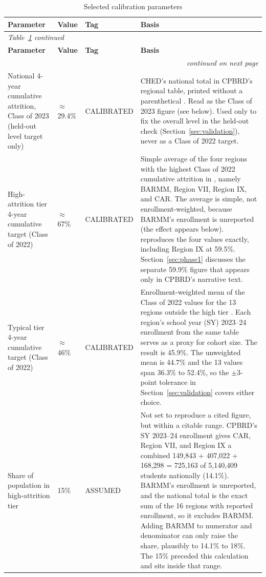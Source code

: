 \documentclass[11pt]{article}
\begin{document}
{\small
\begin{longtable}{@{}p{}p{}p{}p{}@{}}
\caption{Selected calibration parameters}
\label{tab:params}\\
\toprule
\textbf{Parameter} & \textbf{Value} & \textbf{Tag} & \textbf{Basis} \\
\midrule
\endfirsthead
\multicolumn{4}{l}{\textit{Table~\ref{tab:params} continued}}\\
\toprule
\textbf{Parameter} & \textbf{Value} & \textbf{Tag} & \textbf{Basis} \\
\midrule
\endhead
\midrule
\multicolumn{4}{r}{\textit{continued on next page}}\\
\endfoot
\bottomrule
\endlastfoot
National 4-year cumulative attrition, Class of 2023 (held-out level target only) & $\approx$ 29.4\% & CALIBRATED & CHED's national total in CPBRD's regional table, printed without a parenthetical \citep{cpbrd2026}. Read as the Class of 2023 figure (see below). Used only to fix the overall level in the held-out check (Section~\ref{sec:validation}), never as a Class of 2022 target. \\
\addlinespace
High-attrition tier 4-year cumulative target (Class of 2022) & $\approx$ 67\% & CALIBRATED & Simple average of the four regions with the highest Class of 2022 cumulative attrition in \citep{cpbrd2026}, namely BARMM, Region VII, Region IX, and CAR. The average is simple, not enrollment-weighted, because BARMM's enrollment is unreported (the effect appears below). \citep{edcom2025y2} reproduces the four values exactly, including Region IX at 59.5\%. Section~\ref{sec:phase1} discusses the separate 59.9\% figure that appears only in CPBRD's narrative text. \\
\addlinespace
Typical tier 4-year cumulative target (Class of 2022) & $\approx$ 46\% & CALIBRATED & Enrollment-weighted mean of the Class of 2022 values for the 13 regions outside the high tier \citep{cpbrd2026}. Each region's school year (SY) 2023--24 enrollment from the same table serves as a proxy for cohort size. The result is 45.9\%. The unweighted mean is 44.7\% and the 13 values span 36.3\% to 52.4\%, so the $\pm$3-point tolerance in Section~\ref{sec:validation} covers either choice. \\
\addlinespace
Share of population in high-attrition tier & 15\% & ASSUMED & Not set to reproduce a cited figure, but within a citable range. CPBRD's SY 2023--24 enrollment \citep{cpbrd2026} gives CAR, Region VII, and Region IX a combined 149,843 + 407,022 + 168,298 = 725,163 of 5,140,409 students nationally (14.1\%). BARMM's enrollment is unreported, and the national total is the exact sum of the 16 regions with reported enrollment, so it excludes BARMM. Adding BARMM to numerator and denominator can only raise the share, plausibly to 14.1\% to 18\%. The 15\% preceded this calculation and sits inside that range. \\

\end{longtable}}
\end{document}
